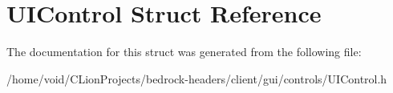 \hypertarget{struct_u_i_control}{}\section{U\+I\+Control Struct Reference}
\label{struct_u_i_control}


The documentation for this struct was generated from the following file\+:\begin{DoxyCompactItemize}
\item 
/home/void/\+C\+Lion\+Projects/bedrock-\/headers/client/gui/controls/U\+I\+Control.\+h\end{DoxyCompactItemize}
